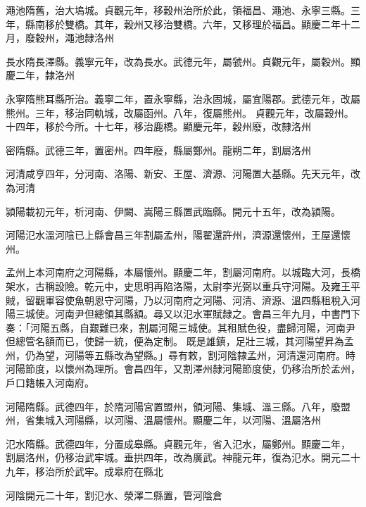 \begin{pinyinscope}
 澠池隋舊，治大塢城。貞觀元年，移穀州治所於此，領福昌、澠池、永寧三縣。三年，縣南移於雙橋。其年，穀州又移治雙橋。六年，又移理於福昌。顯慶二年十二月，廢穀州，澠池隸洛州



 長水隋長澤縣。義寧元年，改為長水。武德元年，屬虢州。貞觀元年，屬穀州。顯慶二年，隸洛州



 永寧隋熊耳縣所治。義寧二年，置永寧縣，治永固城，屬宜陽郡。武德元年，改屬熊州。三年，移治同軌城，改屬函州。八年，復屬熊州。
 貞觀元年，改屬穀州。十四年，移於今所。十七年，移治鹿橋。顯慶元年，穀州廢，改隸洛州



 密隋縣。武德三年，置密州。四年廢，縣屬鄭州。龍朔二年，割屬洛州



 河清咸亨四年，分河南、洛陽、新安、王屋、濟源、河陽置大基縣。先天元年，改為河清



 潁陽載初元年，析河南、伊闕、嵩陽三縣置武臨縣。開元十五年，改為潁陽。



 河陽氾水溫河陰已上縣會昌三年割屬孟州，陽翟還許州，濟源還懷州，王屋還懷州。



 孟州上本河南府之河陽縣，本屬懷州。顯慶二年，割屬河南府。以城臨大河，長橋架水，古稱設險。乾元中，史思明再陷洛陽，太尉李光弼以重兵守河陽。及雍王平賊，留觀軍容使魚朝恩守河陽，乃以河南府之河陽、河清、濟源、溫四縣租稅入河陽三城使。河南尹但總領其縣額。尋又以氾水軍賦隸之。會昌三年九月，中書門下奏：「河陽五縣，自艱難已來，割屬河陽三城使。其租賦色役，盡歸河陽，河南尹但總管名額而已，使歸一統，便為定制。
 既是雄鎮，足壯三城，其河陽望昇為孟州，仍為望，河陽等五縣改為望縣。」尋有敕，割河陰隸孟州，河清還河南府。時河陽節度，以懷州為理所。會昌四年，又割澤州隸河陽節度使，仍移治所於孟州，戶口籍帳入河南府。



 河陽隋縣。武德四年，於隋河陽宮置盟州，領河陽、集城、溫三縣。八年，廢盟州，省集城入河陽縣，以河陽、溫屬懷州。顯慶二年，以河陽、溫屬洛州



 氾水隋縣。武德四年，分置成皋縣。貞觀元年，省入氾水，屬鄭州。顯慶二年，
 割屬洛州，仍移治武牢城。垂拱四年，改為廣武。神龍元年，復為氾水。開元二十九年，移治所於武牢。成皋府在縣北



 河陰開元二十年，割氾水、滎澤二縣置，管河陰倉




\end{pinyinscope}
